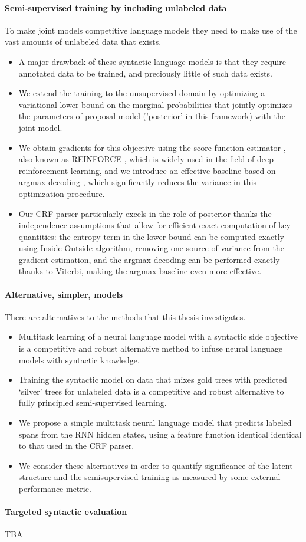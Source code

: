 \paragraph{Semi-supervised training by including unlabeled data} To make joint models competitive language models they need to make use of the vast amounts of unlabeled data that exists.
\begin{itemize}
  \item A major drawback of these syntactic language models is that they require annotated data to be trained, and preciously little of such data exists.
  \item We extend the training to the unsupervised domain by optimizing a variational lower bound on the marginal probabilities that jointly optimizes the parameters of proposal model ('posterior' in this framework) with the joint model.
  \item We obtain gradients for this objective using the score function estimator \citep{fu2006gradient}, also known as REINFORCE \citep{williams1992reinforce}, which is widely used in the field of deep reinforcement learning, and we introduce an effective baseline based on argmax decoding \citep{rennie2017argmax}, which significantly reduces the variance in this optimization procedure.
  \item Our CRF parser particularly excels in the role of posterior thanks the independence assumptions that allow for efficient exact computation of key quantities: the entropy term in the lower bound can be computed exactly using Inside-Outside algorithm, removing one source of variance from the gradient estimation, and the argmax decoding can be performed exactly thanks to Viterbi, making the argmax baseline even more effective.
\end{itemize}

\paragraph{Alternative, simpler, models} There are alternatives to the methods that this thesis investigates.
\begin{itemize}
  \item Multitask learning of a neural language model with a syntactic side objective is a competitive and robust alternative method to infuse neural language models with syntactic knowledge.
  \item Training the syntactic model on data that mixes gold trees with predicted `silver' trees for unlabeled data is a competitive and robust alternative to fully principled semi-supervised learning.
  \item We propose a simple multitask neural language model that predicts labeled spans from the RNN hidden states, using a feature function identical identical to that used in the CRF parser.
  \item We consider these alternatives in order to quantify significance of the latent structure and the semisupervised training as measured by some external performance metric.
\end{itemize}

\paragraph{Targeted syntactic evaluation}
TBA
